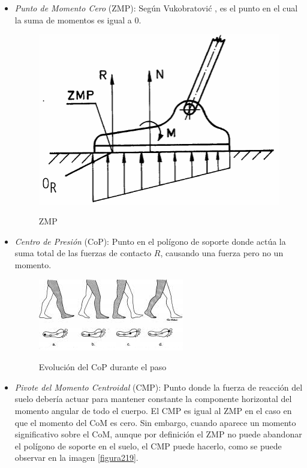\begin{itemize}
\item \emph{Punto de Momento Cero} (ZMP): Según Vukobratović \cite{ref19}, es el punto en el cual la suma de momentos es igual a 0.

\begin{figure}[H]
\centering
{\includegraphics[scale=0.6]{imagenes/apartado_2/217_zmp}}
\caption{ZMP}
\label{figura217}
\end{figure}

\item \emph{Centro de Presión} (CoP): Punto en el polígono de soporte donde actúa la suma total de las fuerzas de contacto $R$, causando una fuerza pero no un momento.

\begin{figure}[H]
\centering
{\includegraphics[scale=1.3]{imagenes/apartado_2/218_cop}}
\caption{Evolución del CoP durante el paso}
\label{figura218}
\end{figure}

\item \emph{Pivote del Momento Centroidal} (CMP): Punto donde la fuerza de reacción del suelo debería actuar para mantener constante la componente horizontal del momento angular de todo el cuerpo. El CMP es igual al ZMP en el caso en que el momento del CoM es cero. Sin embargo, cuando aparece un momento significativo sobre el CoM, aunque por definición el ZMP no puede abandonar el polígono de soporte en el suelo, el CMP puede hacerlo, como se puede observar en la imagen \ref{figura219}.


\end{itemize}
